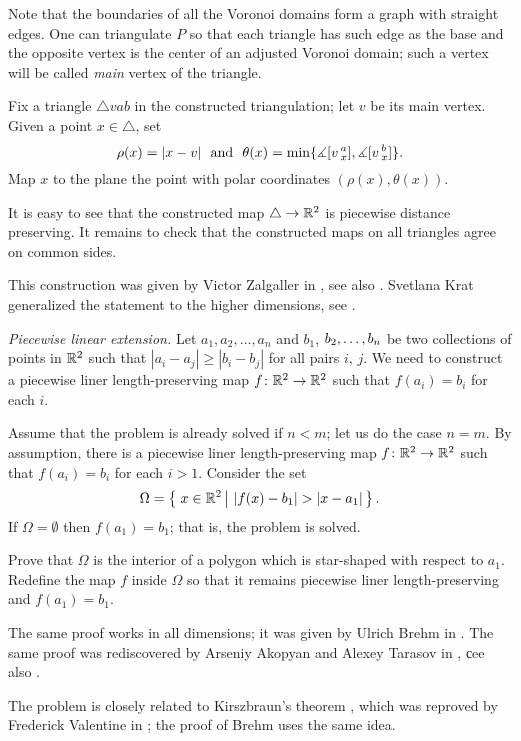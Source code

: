 Note that the boundaries of all the Voronoi domains form a graph with straight edges.
One can triangulate $P$ so that each triangle has such edge as the base 
and the opposite vertex is the center of an adjusted Voronoi domain; such a vertex will be called \emph{main} vertex of the triangle.

Fix a triangle $\triangle vab$ in the constructed triangulation; 
let $v$ be its main vertex.
Given a point 
$x\in  \triangle$, set 
\[\rho(x)=|x-v|\ \ \text{and}\ \  \theta(x)=\min \{\measuredangle \hinge vax,\measuredangle\hinge vbx\}.\]
Map $x$ to the plane the point with polar coordinates $(\rho(x),\theta(x))$.

It is easy to see that the constructed map $\triangle\to\mathbb{R}^2$ is piecewise distance preserving.
It remains to check that the constructed maps on all triangles agree on common sides.


This construction was given by Victor Zalgaller in \cite{zalgaller-polyhedra}, see also \cite{petrunin-yashinsky}.
Svetlana Krat generalized the statement to the higher dimensions,
see \cite{krat}.



\textit{Piecewise linear extension.}
Let $a_1,a_2,\dots,a_n$
and $b_1$, $b_2,\z\dots,b_n$
be two collections of points in $\mathbb{R}^2$
such that $|a_i-a_j|\ge |b_i-b_j|$ for all pairs $i$, $j$.
We need to construct a piecewise liner length-preserving map $f\colon\mathbb{R}^2\to\mathbb{R}^2$
such that $f(a_i)=b_i$ for each $i$.

Assume that the problem is already solved if $n<m$;
let us do the case $n=m$.
By assumption, 
there is a piecewise liner length-preserving map $f\colon\mathbb{R}^2\to\mathbb{R}^2$
such that $f(a_i)=b_i$ for each $i>1$.
Consider the set 
\[\Omega=\set{x\in\RR^2}{|f(x)-b_1|>|x-a_1|}.\]
If $\Omega=\emptyset$ then $f(a_1)=b_1$; 
that is, the problem is solved.

Prove that $\Omega$ is the interior of a polygon
which is star-shaped with respect to $a_1$.
Redefine the map $f$ inside $\Omega$ so that it remains piecewise liner length-preserving and $f(a_1)=b_1$.

The same proof works in all dimensions;
it was given by Ulrich Brehm in \cite{brehm}.
The same proof was rediscovered by Arseniy Akopyan and Alexey Tarasov in \cite{akopyan-tarasov},
сee also \cite{petrunin-yashinsky}.

The problem is closely related to Kirszbraun's theorem \cite{kirszbraun},
which was reproved by Frederick Valentine in \cite{valentine};
the proof of Brehm uses the same idea.






